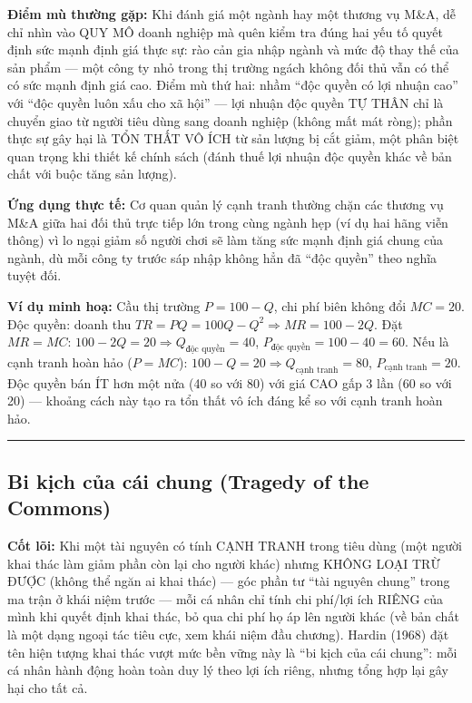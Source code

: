 \documentclass[
]{article}
\begin{document}
\textbf{Điểm mù thường gặp:} Khi đánh giá một ngành hay một thương vụ
M\&A, dễ chỉ nhìn vào QUY MÔ doanh nghiệp mà quên kiểm tra đúng hai yếu
tố quyết định sức mạnh định giá thực sự: rào cản gia nhập ngành và mức
độ thay thế của sản phẩm --- một công ty nhỏ trong thị trường ngách
không đối thủ vẫn có thể có sức mạnh định giá cao. Điểm mù thứ hai: nhầm
``độc quyền có lợi nhuận cao'' với ``độc quyền luôn xấu cho xã hội'' ---
lợi nhuận độc quyền TỰ THÂN chỉ là chuyển giao từ người tiêu dùng sang
doanh nghiệp (không mất mát ròng); phần thực sự gây hại là TỔN THẤT VÔ
ÍCH từ sản lượng bị cắt giảm, một phân biệt quan trọng khi thiết kế
chính sách (đánh thuế lợi nhuận độc quyền khác về bản chất với buộc tăng
sản lượng).

\textbf{Ứng dụng thực tế:} Cơ quan quản lý cạnh tranh thường chặn các
thương vụ M\&A giữa hai đối thủ trực tiếp lớn trong cùng ngành hẹp (ví
dụ hai hãng viễn thông) vì lo ngại giảm số người chơi sẽ làm tăng sức
mạnh định giá chung của ngành, dù mỗi công ty trước sáp nhập không hẳn
đã ``độc quyền'' theo nghĩa tuyệt đối.

\textbf{Ví dụ minh hoạ:} Cầu thị trường \(P = 100 - Q\), chi phí biên
không đổi \(MC = 20\). Độc quyền: doanh thu
\(TR = PQ = 100Q - Q^2 \Rightarrow MR = 100 - 2Q\). Đặt \(MR = MC\):
\(100 - 2Q = 20 \Rightarrow Q_{\text{độc quyền}} = 40\),
\(P_{\text{độc quyền}} = 100 - 40 = 60\). Nếu là cạnh tranh hoàn hảo
(\(P = MC\)): \(100 - Q = 20 \Rightarrow Q_{\text{cạnh tranh}} = 80\),
\(P_{\text{cạnh tranh}} = 20\). Độc quyền bán ÍT hơn một nửa (40 so với
80) với giá CAO gấp 3 lần (60 so với 20) --- khoảng cách này tạo ra tổn
thất vô ích đáng kể so với cạnh tranh hoàn hảo.

\begin{center}\rule{0.5\linewidth}{0.5pt}\end{center}

\subsection{Bi kịch của cái chung (Tragedy of the
Commons)}\label{bi-kux1ecbch-cux1ee7a-cuxe1i-chung-tragedy-of-the-commons}

\textbf{Cốt lõi:} Khi một tài nguyên có tính CẠNH TRANH trong tiêu dùng
(một người khai thác làm giảm phần còn lại cho người khác) nhưng KHÔNG
LOẠI TRỪ ĐƯỢC (không thể ngăn ai khai thác) --- góc phần tư ``tài nguyên
chung'' trong ma trận ở khái niệm trước --- mỗi cá nhân chỉ tính chi
phí/lợi ích RIÊNG của mình khi quyết định khai thác, bỏ qua chi phí họ
áp lên người khác (về bản chất là một dạng ngoại tác tiêu cực, xem khái
niệm đầu chương). Hardin (1968) đặt tên hiện tượng khai thác vượt mức
bền vững này là ``bi kịch của cái chung'': mỗi cá nhân hành động hoàn
toàn duy lý theo lợi ích riêng, nhưng tổng hợp lại gây hại cho tất cả.
\end{document}
